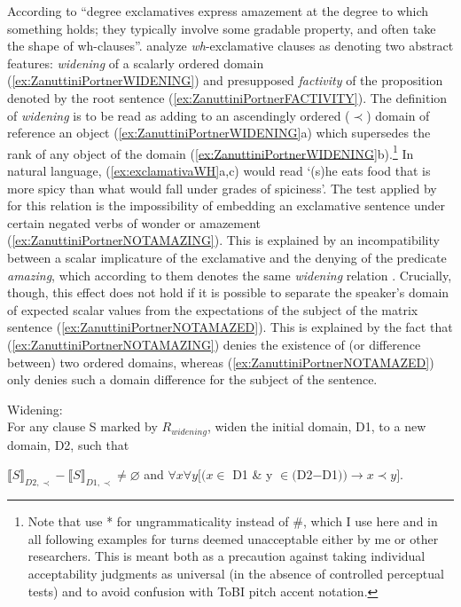 According to \citet[26]{Grosz.2012} ``degree exclamatives express amazement at the degree to which something holds; they typically involve some gradable property, and often take the shape of wh-clauses''. \citet[15,16]{ZanuttiniPortner2003} analyze \textit{wh}-exclamative clauses as 
denoting two abstract features: \textit{widening} of a scalarly ordered 
domain (\ref{ex:ZanuttiniPortnerWIDENING}) 
and presupposed \textit{factivity} of the proposition denoted by the root 
sentence (\ref{ex:ZanuttiniPortnerFACTIVITY}). The definition of 
\textit{widening} is to be read as adding to an ascendingly 
ordered ($\prec$) domain of reference an object 
(\ref{ex:ZanuttiniPortnerWIDENING}a) which supersedes 
the rank of any object of the domain (\ref{ex:ZanuttiniPortnerWIDENING}b).\footnote{Note that \citet{ZanuttiniPortner2003} use * for ungrammaticality instead of \#, which I use here and in all following examples for turns deemed unacceptable either by me or other researchers. This is meant both as a precaution against taking individual acceptability judgments as universal (in the absence of controlled perceptual tests) and to avoid confusion with \ac{ToBI} pitch accent notation.} In natural language, (\ref{ex:exclamativaWH}a,c) would read `(s)he eats food that is more spicy than what would fall under grades of spiciness'.
The test applied by \citet{ZanuttiniPortner2003} for this relation is the impossibility of embedding an 
exclamative sentence under certain negated verbs of wonder or amazement 
(\ref{ex:ZanuttiniPortnerNOTAMAZING}). This is explained by an 
incompatibility between a scalar implicature of the exclamative and the 
denying of the predicate \textit{amazing}, which according to them denotes the 
same \textit{widening} relation \citep[21]{ZanuttiniPortner2003}. 
Crucially, though, this effect does not hold if it is possible to separate 
the speaker's domain of expected scalar values from the expectations of 
the subject of the matrix sentence (\ref{ex:ZanuttiniPortnerNOTAMAZED}). This is explained by the fact that 
(\ref{ex:ZanuttiniPortnerNOTAMAZING}) denies the existence of (or 
difference between) two ordered domains, whereas 
(\ref{ex:ZanuttiniPortnerNOTAMAZED}) only denies such a domain difference 
for the subject of the sentence.

\begin{exe}
	\judgewidth{\#}
	\ex \label{ex:ZanuttiniPortnerWIDENING}Widening:\\
	For any clause S marked by $R_{\textit{widening}}$, widen the 
	initial domain, D1, to a new domain, D2, such that
	\begin{xlist}
		\ex $ \llbracket S \rrbracket_{D2,\prec} - \llbracket S 
		\rrbracket_{D1,\prec} \neq \varnothing $ and 
		\ex $\forall x \forall y [(x\in $ D1 \& y $\in ($D2$-$D1$)) 
		\rightarrow x \prec y] $.
	\end{xlist}

\end{exe}

